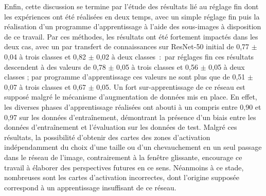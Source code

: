 Enfin, cette discussion se termine par l'étude des résultats lié au réglage fin dont les expériences ont été réalisées en deux temps, avec un simple réglage fin puis la réalisation d'un programme d'apprentissage à l'aide des sous-images à disposition de ce travail. Par ces méthodes, les résultats ont été fortement impactés dans les deux cas, avec un \fscore{} par transfert de connaissances sur ResNet-50 initial de 0,77 $\pm$ 0,04 à trois classes et 0,82 $\pm$ 0,02 à deux classes~:~par réglages fin ces résultats descendent à des valeurs de 0,78 $\pm$ 0,05 à trois classes et 0,56 $\pm$ 0,05 à deux classes ; par programme d'apprentissage ces valeurs ne sont plus que de 0,51 $\pm$ 0,07 à trois classes et 0,67 $\pm$ 0,05. Un fort sur-apprentissage de ce réseau est supposé malgré le mécanisme d'augmentation de données mis en place. En effet, les diverses phases d'apprentissage réalisées ont abouti à un \fscore{} compris entre 0,90 et 0,97 sur les données d'entraînement, démontrant la présence d'un biais entre les données d'entraînement et l'évaluation sur les données de test. Malgré ces résultats, la possibilité d'obtenir des cartes des zones d'activation indépendamment du choix d'une taille ou d'un chevauchement en un seul passage dans le réseau de l'image, contrairement à la fenêtre glissante, encourage ce travail à élaborer des perspectives futures en ce sens. Néanmoins à ce stade, nombreuses sont les cartes d'activation incorrectes, dont l'origine supposée correspond à un apprentissage insuffisant de ce réseau.\par